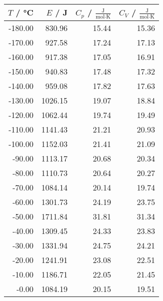 \begin{tabular}{rrrr}
\toprule
$T$ / °C & $E$ / J & $C_p$ / $\frac{\text{J}}{\text{mol}\cdot\text{K}}$ & $C_V$ / $\frac{\text{J}}{\text{mol}\cdot\text{K}}$ \\
\midrule
-180.00 & 830.96 & 15.44 & 15.36 \\
-170.00 & 927.58 & 17.24 & 17.13 \\
-160.00 & 917.38 & 17.05 & 16.91 \\
-150.00 & 940.83 & 17.48 & 17.32 \\
-140.00 & 959.08 & 17.82 & 17.63 \\
-130.00 & 1026.15 & 19.07 & 18.84 \\
-120.00 & 1062.44 & 19.74 & 19.49 \\
-110.00 & 1141.43 & 21.21 & 20.93 \\
-100.00 & 1152.03 & 21.41 & 21.09 \\
-90.00 & 1113.17 & 20.68 & 20.34 \\
-80.00 & 1110.73 & 20.64 & 20.27 \\
-70.00 & 1084.14 & 20.14 & 19.74 \\
-60.00 & 1301.73 & 24.19 & 23.75 \\
-50.00 & 1711.84 & 31.81 & 31.34 \\
-40.00 & 1309.45 & 24.33 & 23.83 \\
-30.00 & 1331.94 & 24.75 & 24.21 \\
-20.00 & 1241.91 & 23.08 & 22.51 \\
-10.00 & 1186.71 & 22.05 & 21.45 \\
-0.00 & 1084.19 & 20.15 & 19.51 \\
\bottomrule
\end{tabular}

